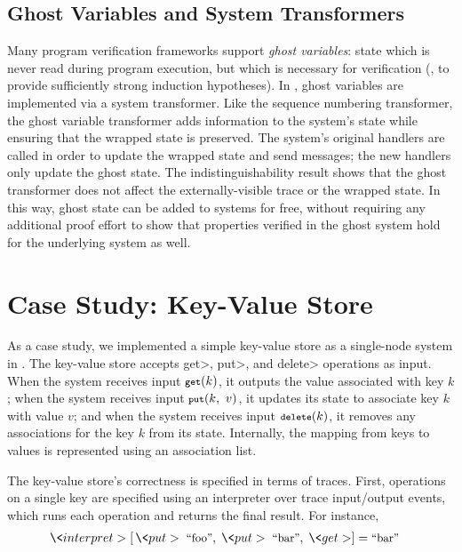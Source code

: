 \subsection{Ghost Variables and System Transformers}

Many program verification frameworks support
\textit{ghost variables}: state which is never read during
program execution, but which is necessary for verification (\eg, to
provide sufficiently strong induction hypotheses). In \Verdi, ghost
variables are implemented via a system transformer. Like the sequence
numbering transformer, the ghost variable transformer adds information
to the system's state while ensuring that the wrapped state is
preserved. The system's original handlers are called in order to
update the wrapped state and send messages; the new handlers only
update the ghost state. The indistinguishability result shows that the
ghost transformer does not affect the externally-visible trace or the
wrapped state. In this way, ghost state can be added to \Verdi systems
for free, without requiring any additional proof effort to show
that properties verified in the ghost system hold for the underlying
system as well.

\section{Case Study: Key-Value Store}\label{sec:verdi:casestudy-kvstore}

\newcommand{\getk}{\<get>\xspace}
\newcommand{\putk}{\<put>\xspace}
\newcommand{\delk}{\<delete>\xspace}

As a case study, we implemented a simple key-value store as a single-node
system in \Verdi. The key-value store accepts \getk, \putk, and \delk
operations as input.  When the system receives input $\getk(k)$, it outputs
the value associated with key $k$; when the system receives input $\putk(k,\ v)$, it
updates its state to associate key $k$ with value $v$; and when the system
receives input $\delk(k)$, it removes any associations for the key $k$ from its
state.  Internally, the mapping from keys to values is represented using an
association list.

The key-value store's correctness is specified in terms of traces. First,
operations on a single key are specified using an interpreter over trace
input/output events, which
runs each operation and returns the final result.  For instance,
\begin{align*}
  \<interpret>&\;[ \,\putk \; \mbox{\small{\text{``foo''}}}
  , \; \putk \; \mbox{\small{\text{``bar''}}}  , \; \getk  ] = \mbox{\small\text{``bar''}}
\end{align*}

